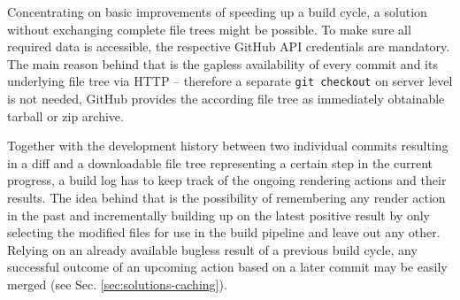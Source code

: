 Concentrating on basic improvements of speeding up a build cycle, a solution without exchanging complete file trees might be possible. To make sure all required data is accessible, the respective GitHub API credentials are mandatory. The main reason behind that is the gapless availability of every commit and its underlying file tree via HTTP -- therefore a separate \texttt{git checkout} on server level is not needed, GitHub provides the according file tree as immediately obtainable tarball or zip archive.

Together with the development history between two individual commits resulting in a diff and a downloadable file tree representing a certain step in the current progress, a build log has to keep track of the ongoing rendering actions and their results. The idea behind that is the possibility of remembering any render action in the past and incrementally building up on the latest positive result by only selecting the modified files for use in the build pipeline and leave out any other. Relying on an already available bugless result of a previous build cycle, any successful outcome of an upcoming action based on a later commit may be easily merged (see Sec. \ref{sec:solutions-caching}).

